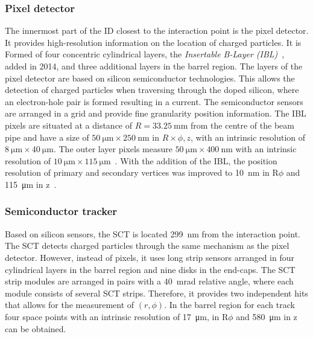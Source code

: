 \subsubsection{Pixel detector}
The innermost part of the ID closest to the interaction point is the pixel detector. It provides high-resolution information on the location of charged particles. It is Formed of four concentric cylindrical layers, the \emph{Insertable B-Layer (IBL)}~\cite{ATLAS:IBL-TDR}, added in 2014, and three additional layers in the barrel region. The layers of the pixel detector are based on silicon semiconductor technologies. This allows the detection of charged particles when traversing through the doped silicon, where an electron-hole pair is formed resulting in a current. The semiconductor sensors are arranged in a grid and provide fine granularity position information. The IBL pixels are situated at a distance of $R = \SI{33.25}{\milli\meter}$ from the centre of the beam pipe and have a size of $\SI{50}{\micro\meter} \times \SI{250}{\nano\meter}$ in $R \times \phi, z$, with an intrinsic resolution of $\SI{8}{\micro\meter} \times \SI{40}{\micro\meter}$. The outer layer pixels measure $\SI{50}{\micro\meter} \times \SI{400}{\nano\meter}$ with an intrinsic resolution of $\SI{10}{\micro\meter} \times \SI{115}{\micro\meter}$~\cite{ATLAS:ID-TDR}. With the addition of the IBL, the position resolution of primary and secondary vertices was improved to \SI{10}{\nano\meter} in R$\phi$ and \SI{115}{\micro\meter} in z~\cite{Rosa}. 

\subsubsection{Semiconductor tracker}
Based on silicon sensors, the SCT is located \SI{299}{\nano\meter} from the interaction point. The SCT detects charged particles through the same mechanism as the pixel detector. However, instead of pixels, it uses long strip sensors arranged in four cylindrical layers in the barrel region and nine disks in the end-caps. The SCT strip modules are arranged in pairs with a \SI{40}{\milli\radian} relative angle, where each module consists of several SCT strips. Therefore, it provides two independent hits that allows for the measurement of $(r,\phi)$. In the barrel region for each track four space points with an intrinsic resolution of \SI{17}{\micro\meter}, in R$\phi$ and \SI{580}{\micro\meter} in z can be obtained.

